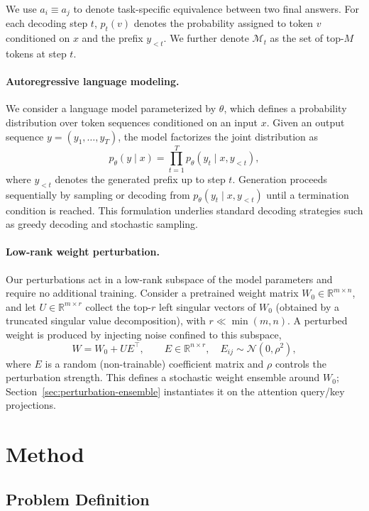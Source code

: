 \documentclass{article} %
\begin{document}
We use $a_i \equiv a_j$ to denote task-specific equivalence between two final answers. For each decoding step $t$, $p_t(v)$ denotes the probability assigned to token $v$ conditioned on $x$ and the prefix $y_{<t}$. We further denote $\mathcal{M}_t$ as the set of top-$M$ tokens at step $t$.

\paragraph{Autoregressive language modeling.}
We consider a language model parameterized by $\theta$, which defines a probability distribution over token sequences conditioned on an input $x$. Given an output sequence $y = (y_1, \dots, y_T)$, the model factorizes the joint distribution as
\[
p_{\theta}(y \mid x) = \prod_{t=1}^{T} p_{\theta}(y_t \mid x, y_{<t}),
\]
where $y_{<t}$ denotes the generated prefix up to step $t$. Generation proceeds sequentially by sampling or decoding from $p_{\theta}(y_t \mid x, y_{<t})$ until a termination condition is reached. This formulation underlies standard decoding strategies such as greedy decoding and stochastic sampling.

\paragraph{Low-rank weight perturbation.}
Our perturbations act in a low-rank subspace of the model parameters and require
no additional training. Consider a pretrained weight matrix
$W_0 \in \mathbb{R}^{m \times n}$, and let $U \in \mathbb{R}^{m \times r}$ collect
the top-$r$ left singular vectors of $W_0$ (obtained by a truncated singular value
decomposition), with $r \ll \min(m,n)$. A perturbed weight is produced by
injecting noise confined to this subspace,
\[
W = W_0 + U E^\top, \qquad
E \in \mathbb{R}^{n \times r},\quad E_{ij} \sim \mathcal{N}(0, \rho^2),
\]
where $E$ is a random (non-trainable) coefficient matrix and $\rho$ controls the
perturbation strength. This defines a stochastic weight ensemble around $W_0$;
Section~\ref{sec:perturbation-ensemble} instantiates it on the attention
query/key projections.

\section{Method}

\subsection{Problem Definition}
\end{document}
